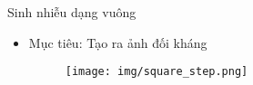 \documentclass[aspectratio=169, 12pt]{beamer}
\begin{document}
\begin{frame}{Sinh nhiễu dạng vuông} 
\begin{itemize}
    \item Mục tiêu: Tạo ra ảnh đối kháng
\vspace{0.2cm}
    \begin{figure}[!hbpt]
      \centering
      \texttt{[image: img/square\_step.png]}
      \label{fig:proposed_method}
    \end{figure}
\end{itemize}

\end{frame}
\end{document}
